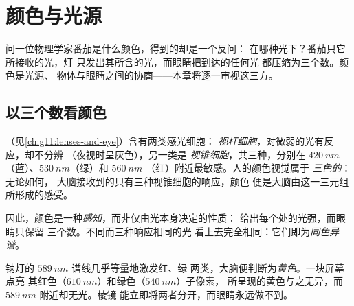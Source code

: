 \chapter{颜色与光源}\label{ch:g11:color-light-sources}

问一位物理学家番茄是什么颜色，得到的却是一个反问：
在哪种光下？番茄只它所接收的光，灯
只发出其所含的光，而眼睛把到达的任何光
都压缩为三个数。颜色是光源、
物体与眼睛之间的协商——本章将逐一审视这三方。

\section{以三个数看颜色}

\begin{definition}[视锥细胞与三色视觉]\label{def:g11:color-light-sources:cones}
（见\cref{ch:g11:lenses-and-eye}）含有两类感光细胞：
\emph{视杆细胞}，对微弱的光有反应，却不分辨
（夜视时呈灰色），另一类是
\emph{视锥细胞}，共三种，分别在
$\qty{420}{nm}$（蓝）、$\qty{530}{nm}$（绿）和 $\qty{560}{nm}$
（红）附近最敏感。人的颜色视觉属于
\emph{三色的}：无论如何，
大脑接收到的只有三种视锥细胞的响应，颜色
便是大脑由这一三元组所形成的感受。
\end{definition}

\begin{definition}[颜色即感知]\label{def:g11:color-light-sources:perception}
因此，颜色是一种\emph{感知}，而非仅由光本身决定的性质：
给出每个处的光强，而眼睛只保留
三个数。不同而三种响应相同的光
看上去完全相同：它们即为\emph{同色异谱}。
\end{definition}

\begin{example}[两种黄色]\label{ex:g11:color-light-sources:yellows}
钠灯的 $\qty{589}{nm}$ 谱线几乎等量地激发红、绿
两类，大脑便判断为\emph{黄色}。一块屏幕点亮
其红色（$\qty{610}{nm}$）和绿色（$\qty{540}{nm}$）子像素，
所呈现的黄色与之无异，而 $\qty{589}{nm}$ 附近却无光。棱镜
能立即将两者分开，而眼睛永远做不到。
\end{example}

